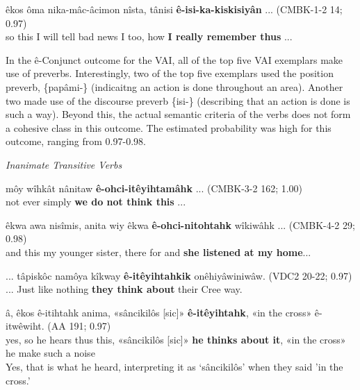     \begin{exe}
    \ex
    \gll êkos ôma nika-mâc-âcimon nîsta, tânisi \textbf{ê-isi-ka-kiskisiyân} ... \tiny{(CMBK-1-2 14; 0.97)} \\
         so this {I will tell bad news} {I too}, how {\textbf{I really remember thus}} ... \\
    \trans  
    \label{ai-cnjtype5}
    \end{exe}

In the ê-Conjunct outcome for the VAI, all of the top five VAI exemplars make use of preverbs. Interestingly, two of the top five exemplars used the position preverb, \{papâmi-\} (indicaitng an action is done throughout an area). Another two made use of the discourse preverb \{isi-\} (describing that an action is done is such a way). Beyond this, the actual semantic criteria of the verbs does not form a cohesive class in this outcome. The estimated probability was high for this outcome, ranging from 0.97-0.98.
    
\vspace{5mm}
    \textit{Inanimate Transitive Verbs}
    
    \begin{exe}
    \ex
    \gll môy wîhkât nânitaw \textbf{ê-ohci-itêyihtamâhk} ... \tiny{(CMBK-3-2 162; 1.00)} \\
     not ever simply {\textbf{we do not think this}} ...  \\
    \trans 
    \label{ti-cnjtype1}
    \end{exe}
    
    \begin{exe}
    \ex
    \gll êkwa awa nisîmis, anita wiy êkwa \textbf{ê-ohci-nitohtahk} wîkiwâhk ... \tiny{(CMBK-4-2 29; 0.98)} \\
     and this {my younger sister}, there for and  {\textbf{she listened at my home}}...  \\
    \trans 
    \label{ti-cnjtype2}
    \end{exe}
    
    \begin{exe}
    \ex
    \gll ... tâpiskôc {namôya kîkway} \textbf{ê-itêyihtahkik} onêhiyâwiniwâw. \tiny{(VDC2 20-22; 0.97)} \\
    ... {Just like} {nothing} {\textbf{they think about}} {their Cree way}.
\\
    \trans 
    \label{ti-cnjtype3}
    \end{exe}
    
    \begin{exe}
    \ex
    \gll â, êkos ê-itihtahk anima, «sâncikilôs [sic]» \textbf{ê-itêyihtahk}, «in the cross» ê-itwêwiht. \tiny{(AA 191; 0.97)}
 \\
     yes, so {he hears thus} this, «sâncikilôs [sic]» {\textbf{he thinks about it}}, «in the cross» {he make such a noise} \\
    \trans Yes, that is what he heard, interpreting it as `sâncikilôs' when they said 'in the cross.' \tiny{\citep[124-125]{AhenakewAlice2000}}
    \label{ti-cnjtype4}
    \end{exe}
    

